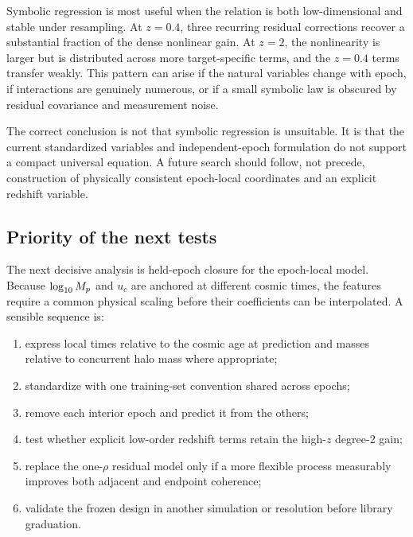 Symbolic regression is most useful when the relation is both low-dimensional
and stable under resampling. At $z=0.4$, three recurring residual corrections
recover a substantial fraction of the dense nonlinear gain. At $z=2$, the
nonlinearity is larger but is distributed across more target-specific terms,
and the $z=0.4$ terms transfer weakly. This pattern can arise if the natural
variables change with epoch, if interactions are genuinely numerous, or if a
small symbolic law is obscured by residual covariance and measurement noise.

The correct conclusion is not that symbolic regression is unsuitable. It is
that the current standardized variables and independent-epoch formulation do
not support a compact universal equation. A future search should follow, not
precede, construction of physically consistent epoch-local coordinates and an
explicit redshift variable.

\subsection{Priority of the next tests}

The next decisive analysis is held-epoch closure for the epoch-local model.
Because $\log_{10} M_p$ and $u_c$ are anchored at different cosmic times, the
features require a common physical scaling before their coefficients can be
interpolated. A sensible sequence is:
\begin{enumerate}
  \item express local times relative to the cosmic age at prediction and masses
  relative to concurrent halo mass where appropriate;
  \item standardize with one training-set convention shared across epochs;
  \item remove each interior epoch and predict it from the others;
  \item test whether explicit low-order redshift terms retain the high-$z$
  degree-2 gain;
  \item replace the one-$\rho$ residual model only if a more flexible process
  measurably improves both adjacent and endpoint coherence;
  \item validate the frozen design in another simulation or resolution before
  library graduation.
\end{enumerate}
